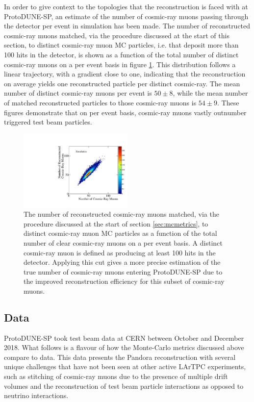 In order to give context to the topologies that the reconstruction is faced with at ProtoDUNE-SP, an estimate of the number of cosmic-ray muons passing through the detector per event in simulation has been made.  The number of reconstructed cosmic-ray muons matched, via the procedure discussed at the start of this section, to distinct cosmic-ray muon MC particles, i.e. that deposit more than 100 hits in the detector, is shown as a function of the total number of distinct cosmic-ray muons on a per event basis in figure \ref{fig:crnperevt}.  This distribution follows a linear trajectory, with a gradient close to one, indicating that the reconstruction on average yields one reconstructed particle per distinct cosmic-ray.  The mean number of distinct cosmic-ray muons per event is $50\pm8$, while the mean number of matched reconstructed particles to those cosmic-ray muons is $54\pm9$.  These figures demonstrate that on per event basis, cosmic-ray muons vastly outnumber triggered test beam particles.

\begin{figure}
\centering
\includegraphics[width=0.5\textwidth]{Figures/Metrics/MC/Cosmics/CRMatchesCosmicRayEvent.pdf}
\caption{The number of reconstructed cosmic-ray muons matched, via the procedure discussed at the start of section \ref{sec:mcmetrics}, to distinct cosmic-ray muon MC particles as a function of the total number of clear cosmic-ray muons on a per event basis.  A distinct cosmic-ray muon is defined as producing at least 100 hits in the detector.  Applying this cut gives a more precise estimation of the true number of cosmic-ray muons entering ProtoDUNE-SP due to the improved reconstruction efficiency for this subset of cosmic-ray muons.}
\label{fig:crnperevt}
\end{figure}

\subsection{Data}
\label{sec:data}
ProtoDUNE-SP took test beam data at CERN between October and December 2018.  What follows is a flavour of how the Monte-Carlo metrics discussed above compare to data.  This data presents the Pandora reconstruction with several unique challenges that have not been seen at other active LArTPC experiments, such as stitching of cosmic-ray muons due to the presence of multiple drift volumes and the reconstruction of test beam particle interactions as opposed to neutrino interactions.  

